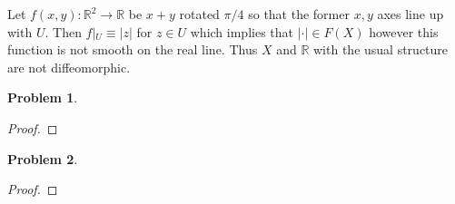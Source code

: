 \documentclass[10pt]{article}
\newcommand{\sk}{\vskip 10mm}
\newcommand{\bb}[1]{\mathbb{#1}}
\theoremstyle{plain}
\newtheorem{problem}{Problem}
\theoremstyle{remark}
\begin{document}
Let $f(x,y):\bb{R}^2\rightarrow \bb{R}$ be $x+y$ rotated $\pi/4$ so that the former $x,y$ axes
line up with $U$. Then $f|_U\equiv |z|$ for $z\in U$ which implies that $|\cdot|\in F(X)$ however
this function is not smooth on the real line. Thus $X$ and $\bb{R}$ with the usual
structure are not diffeomorphic.

\begin{problem}
  
\end{problem}

\begin{proof}
  
\end{proof}

\sk

\begin{problem}
  
\end{problem}

\begin{proof}
  
\end{proof}

\end{document}
